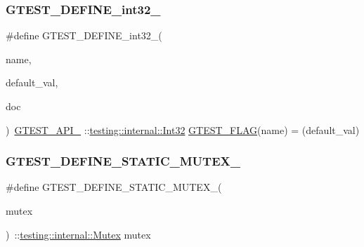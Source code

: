 \subsubsection{\texorpdfstring{GTEST\_DEFINE\_int32\_}{GTEST\_DEFINE\_int32\_}}
{\footnotesize\ttfamily \#define G\+T\+E\+S\+T\+\_\+\+D\+E\+F\+I\+N\+E\+\_\+int32\+\_\+(\begin{DoxyParamCaption}\item[{}]{name,  }\item[{}]{default\+\_\+val,  }\item[{}]{doc }\end{DoxyParamCaption})~\mbox{\hyperlink{_obj__test_2lib_2googletest-release-1_88_81_2googletest_2include_2gtest_2internal_2gtest-port_8h_aa73be6f0ba4a7456180a94904ce17790}{G\+T\+E\+S\+T\+\_\+\+A\+P\+I\+\_\+}} \+::\mbox{\hyperlink{namespacetesting_1_1internal_af89e21e4043b5cf0c120af487b24fa06}{testing\+::internal\+::\+Int32}} \mbox{\hyperlink{_obj__test_2lib_2googletest-release-1_88_81_2googletest_2include_2gtest_2internal_2gtest-port_8h_a828f4e34a1c4b510da50ec1563e3562a}{G\+T\+E\+S\+T\+\_\+\+F\+L\+AG}}(name) = (default\+\_\+val)}

\mbox{\label{_obj__test_2lib_2googletest-master_2googletest_2include_2gtest_2internal_2gtest-port_8h_a85d5cd679fdbe87383e7dfd1c6651eaa}} 
\subsubsection{\texorpdfstring{GTEST\_DEFINE\_STATIC\_MUTEX\_}{GTEST\_DEFINE\_STATIC\_MUTEX\_}}
{\footnotesize\ttfamily \#define G\+T\+E\+S\+T\+\_\+\+D\+E\+F\+I\+N\+E\+\_\+\+S\+T\+A\+T\+I\+C\+\_\+\+M\+U\+T\+E\+X\+\_\+(\begin{DoxyParamCaption}\item[{}]{mutex }\end{DoxyParamCaption})~\+::\mbox{\hyperlink{classtesting_1_1internal_1_1_mutex}{testing\+::internal\+::\+Mutex}} mutex}

\mbox{\label{_obj__test_2lib_2googletest-master_2googletest_2include_2gtest_2internal_2gtest-port_8h_a885e18fe217a6e85553d408b99252c12}} 
